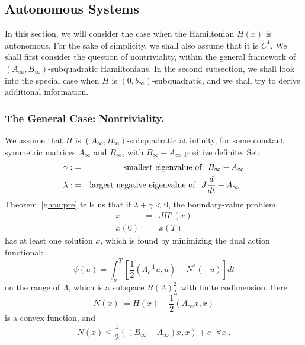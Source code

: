 \documentclass{svproc}
\begin{document}
%
\subsection{Autonomous Systems}
%
In this section, we will consider the case when the Hamiltonian $H(x)$
is autonomous. For the sake of simplicity, we shall also assume that it
is $C^{1}$.
We shall first consider the question of nontriviality, within the
general framework of
$\left(A_{\infty},B_{\infty}\right)$-subquadratic Hamiltonians. In
the second subsection, we shall look into the special case when $H$ is
$\left(0,b_{\infty}\right)$-subquadratic,
and we shall try to derive additional information.
%
\subsubsection{The General Case: Nontriviality.}
%
We assume that $H$ is
$\left(A_{\infty},B_{\infty}\right)$-sub\-qua\-dra\-tic at infinity,
for some constant symmetric matrices $A_{\infty}$ and $B_{\infty}$,
with $B_{\infty}-A_{\infty}$ positive definite. Set:
\begin{eqnarray}
\gamma :&=&{\rm smallest\ eigenvalue\ of}\ \ B_{\infty} - A_{\infty} \\
  \lambda : &=& {\rm largest\ negative\ eigenvalue\ of}\ \
  J \frac{d}{dt} +A_{\infty}\ .
\end{eqnarray}
Theorem~\ref{ghou:pre} tells us that if $\lambda +\gamma < 0$, the
boundary-value problem:
\begin{equation}
\begin{array}{rcl}
  \dot{x}&=&JH' (x)\\
  x(0)&=&x (T)
\end{array}
\end{equation}
has at least one solution
$\overline{x}$, which is found by minimizing the dual
action functional:
\begin{equation}
  \psi (u) = \int_{o}^{T} \left[\frac{1}{2}
  \left(\Lambda_{o}^{-1} u,u\right) + N^{\ast} (-u)\right] dt
\end{equation}
on the range of $\Lambda$, which is a subspace $R (\Lambda)_{L}^{2}$
with finite codimension. Here
\begin{equation}
  N(x) := H(x) - \frac{1}{2} \left(A_{\infty} x,x\right)
\end{equation}
is a convex function, and
\begin{equation}
  N(x) \le \frac{1}{2}
  \left(\left(B_{\infty} - A_{\infty}\right) x,x\right)
  + c\ \ \ \forall x\ .
\end{equation}
\end{document}
